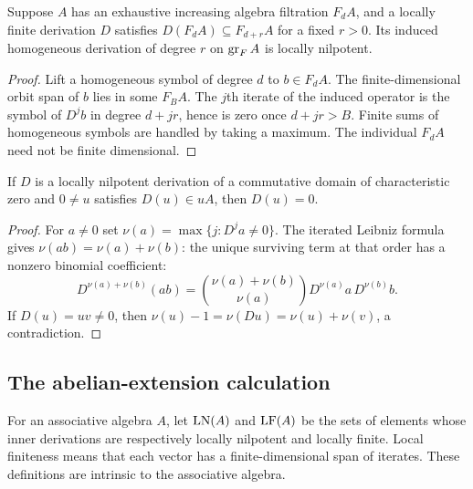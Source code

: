 \begin{lemma}\label{lem:leading-LF}
Suppose $A$ has an exhaustive increasing algebra filtration $F_dA$,
and a locally finite derivation $D$ satisfies
$D(F_dA)\subseteq F_{d+r}A$ for a fixed $r>0$. Its induced homogeneous
derivation of degree $r$ on $\operatorname{gr}_FA$ is locally nilpotent.
\end{lemma}
\begin{proof}
Lift a homogeneous symbol of degree $d$ to $b\in F_dA$. The
finite-dimensional orbit span of $b$ lies in some $F_BA$. The $j$th
iterate of the induced operator is the symbol of $D^jb$ in degree
$d+jr$, hence is zero once $d+jr>B$. Finite sums of homogeneous
symbols are handled by taking a maximum. The individual $F_dA$ need
not be finite dimensional.
\end{proof}

\begin{lemma}\label{lem:LND-divisibility}
If $D$ is a locally nilpotent derivation of a commutative domain of
characteristic zero and $0\ne u$ satisfies $D(u)\in uA$, then $D(u)=0$.
\end{lemma}
\begin{proof}
For $a\ne0$ set $\nu(a)=\max\{j:D^ja\ne0\}$. The iterated Leibniz
formula gives $\nu(ab)=\nu(a)+\nu(b)$: the unique surviving term at
that order has a nonzero binomial coefficient:
\[
 D^{\nu(a)+\nu(b)}(ab)
 =\binom{\nu(a)+\nu(b)}{\nu(a)}D^{\nu(a)}a\,D^{\nu(b)}b.
\]
If $D(u)=uv\ne0$, then
$\nu(u)-1=\nu(Du)=\nu(u)+\nu(v)$, a contradiction.
\end{proof}

\subsection{The abelian-extension calculation}
For an associative algebra $A$, let $\operatorname{LN}(A)$ and $\operatorname{LF}(A)$ be the
sets of elements whose inner derivations are respectively locally
nilpotent and locally finite. Local finiteness means that each vector
has a finite-dimensional span of iterates. These definitions are
intrinsic to the associative algebra.

